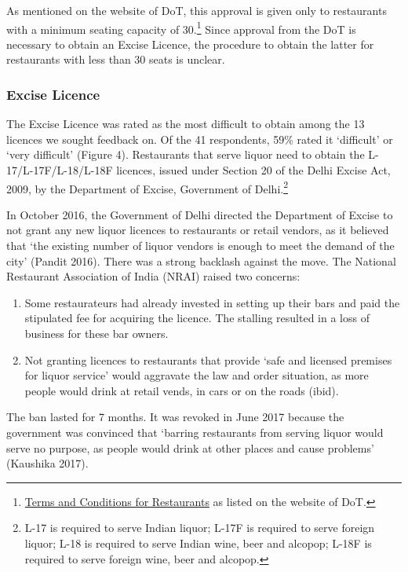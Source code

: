 \documentclass[a4paper, 12pt]{article}
\begin{document}
		As mentioned on the website of DoT, this approval is given only to restaurants with a minimum seating capacity of 30.\footnote{\href{https://bit.ly/2NMdccI}{Terms and Conditions for Restaurants} as listed on the website of DoT.}  Since approval from the 
DoT is necessary to obtain an Excise Licence, the procedure to obtain the latter for restaurants with less than 30 seats is unclear. %
		
		
		\subsubsection{Excise Licence}
		The Excise Licence was rated as the most difficult to obtain among the 13 licences we sought feedback on. Of the 41 respondents, 59\% rated it ‘difficult’ or ‘very difficult’ (Figure 4). Restaurants that serve liquor need to obtain the L-17/L-17F/L-18/L-18F 
licences, issued under Section 20 of the Delhi Excise Act, 2009, by the Department of Excise, Government of Delhi.\footnote{L-17 is required to serve Indian liquor; L-17F is required to serve foreign liquor; L-18 is required to serve Indian wine, beer and alcopop; 
L-18F is required to serve foreign wine, beer and alcopop.} %
		
		In October 2016, the Government of Delhi directed the Department of Excise to not grant any new liquor licences to restaurants or retail vendors, as it believed that ‘the existing number of liquor vendors is enough to meet the demand of the city’ (Pandit 
2016). There was a strong backlash against the move. The National Restaurant Association of India (NRAI) raised two concerns:
		\begin {enumerate}
			\item Some restaurateurs had already invested in setting up their bars and paid the stipulated fee for acquiring the licence. The stalling resulted in a loss of business for these bar owners.
			\item Not granting licences to restaurants that provide ‘safe and licensed premises for liquor service’ would aggravate the law and order situation, as more people would drink at retail vends, in cars or on the roads (ibid).
		\end {enumerate}
		
		The ban lasted for 7 months. It was revoked in June 2017 because the government was convinced that ‘barring restaurants from serving liquor would serve no purpose, as people would drink at other places and cause problems’ (Kaushika 2017).
		
\end{document}
